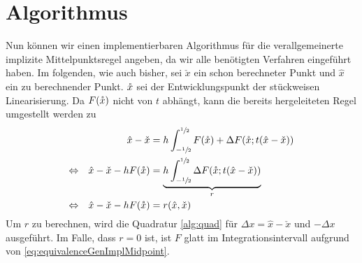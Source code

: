 \section{Algorithmus}
Nun können wir einen implementierbaren Algorithmus für die verallgemeinerte implizite Mittelpunktsregel angeben, da wir alle benötigten Verfahren eingeführt haben. Im folgenden, wie auch bisher, sei $\check x$ ein schon berechneter Punkt und $\hat x$ ein zu berechnender Punkt. $\mathring{x}$ sei der Entwicklungspunkt der stückweisen Linearisierung. Da $F(\mathring{x})$ nicht von $t$ abhängt, kann die bereits hergeleiteten Regel umgestellt werden zu 
\begin{equation}
\label{eq:genMidpointAlg}
\begin{aligned}
 && \hat x - \check x &= h\int_{-\sfrac{1}{2}}^{\sfrac{1}{2}}F(\mathring{x})+ \Delta F(\mathring{x};t(\hat x - \check x)) \\
 \Leftrightarrow && \hat x - \check x - hF(\mathring{x}) & =\underbrace{h \int_{-\sfrac{1}{2}}^{\sfrac{1}{2}} \Delta F(\mathring{x};t(\hat x - \check x))}_{r} \\
 \Leftrightarrow && \hat x - \check x - hF(\mathring{x}) & =r(\hat x,\check x)
\end{aligned}
\end{equation}
Um $r$ zu berechnen, wird die Quadratur \ref{alg:quad} für $\Delta x = \hat x - \check x$ und $-\Delta x$ ausgeführt. Im Falle, dass $r=0$ ist, ist $F$ glatt im Integrationsintervall aufgrund von \eqref{eq:equivalenceGenImplMidpoint}.

